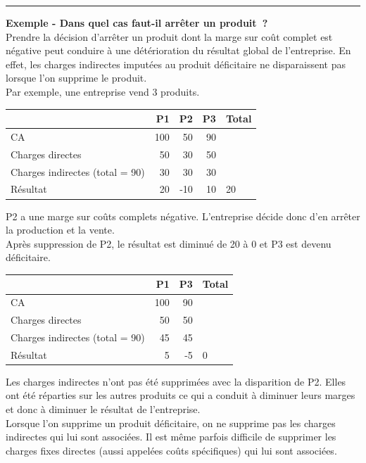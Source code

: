 \documentclass{tufte-handout}
\begin{document}
\noindent\rule{\textwidth}{0.5pt}
\textbf{Exemple - Dans quel cas faut-il arrêter un produit ?}\\
Prendre la décision d'arrêter un produit dont la marge sur coût complet est négative peut conduire à une détérioration du résultat global de l'entreprise. En effet, les charges indirectes imputées au produit déficitaire ne disparaissent pas lorsque l'on supprime le produit.\\

Par exemple, une entreprise vend 3 produits.\\

\begin{center}
\begin{tabular}{lrrrl}
 & P1 & P2 & P3 & Total\\
\hline
CA & 100 & 50 & 90 & \\
Charges directes & 50 & 30 & 50 & \\
Charges indirectes (total = 90) & 30 & 30 & 30 & \\
Résultat & 20 & -10 & 10 & 20\\
\end{tabular}
\end{center}

P2 a une marge sur coûts complets négative. L'entreprise décide donc d'en arrêter la production et la vente.\\

Après suppression de P2, le résultat est diminué de 20 à 0 et P3 est devenu déficitaire.\\

\begin{center}
\begin{tabular}{lrrl}
 & P1 & P3 & Total\\
\hline
CA & 100 & 90 & \\
Charges directes & 50 & 50 & \\
Charges indirectes (total = 90) & 45 & 45 & \\
Résultat & 5 & -5 & 0\\
\end{tabular}
\end{center}

Les charges indirectes n'ont pas été supprimées avec la disparition de P2. Elles ont été réparties sur les autres produits ce qui a conduit à diminuer leurs marges et donc à diminuer le résultat de l'entreprise.\\

Lorsque l'on supprime un produit déficitaire, on ne supprime pas les charges indirectes qui lui sont associées. Il est même parfois difficile de supprimer les charges fixes directes (aussi appelées coûts spécifiques) qui lui sont associées.\\
\end{document}

